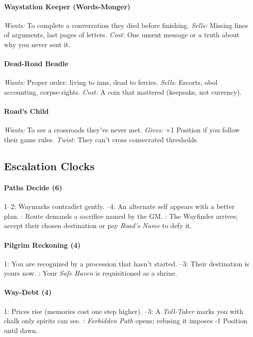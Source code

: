 \paragraph{Waystation Keeper (Words-Monger)}
\emph{Wants:} To complete a conversation they died before finishing. 
\emph{Sells:} Missing lines of arguments, last pages of letters. 
\emph{Cost:} One unsent message or a truth about why you never sent it.

\paragraph{Dead-Road Beadle}
\emph{Wants:} Proper order: living to inns, dead to ferries. 
\emph{Sells:} Escorts, obol accounting, corpse-rights. 
\emph{Cost:} A coin that mattered (keepsake, not currency).

\paragraph{Road’s Child}
\emph{Wants:} To see a crossroads they’ve never met. 
\emph{Gives:} +1 Position if you follow their game rules. 
\emph{Twist:} They can’t cross consecrated thresholds.
\subsection*{Escalation Clocks}

\paragraph{Paths Decide (6)}
1–2: Waymarks contradict gently. –4: An alternate self appears with a better plan. : Route demands a sacrifice named by the GM. : The Wayfinder arrives; accept their chosen destination or pay \emph{Road’s Name} to defy it.

\paragraph{Pilgrim Reckoning (4)}
1: You are recognized by a procession that hasn’t started. –3: Their destination is yours now. : Your \emph{Safe Haven} is requisitioned as a shrine.

\paragraph{Way-Debt (4)}
1: Prices rise (memories cost one step higher). –3: A \emph{Toll-Taker} marks you with chalk only spirits can see. : \emph{Forbidden Path} opens; refusing it imposes -1 Position until dawn.
